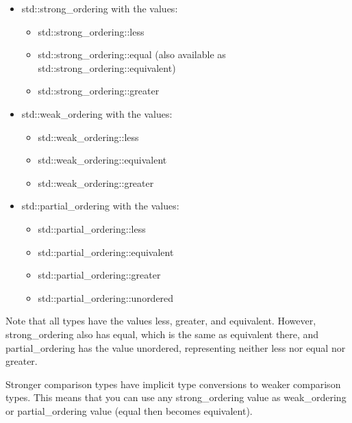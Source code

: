 
\begin{itemize}
\item
std::strong\_ordering with the values:
\begin{itemize}
\item
std::strong\_ordering::less

\item
std::strong\_ordering::equal (also available as std::strong\_ordering::equivalent)

\item
std::strong\_ordering::greater
\end{itemize}

\item
std::weak\_ordering with the values:
\begin{itemize}
\item
std::weak\_ordering::less

\item
std::weak\_ordering::equivalent

\item
std::weak\_ordering::greater
\end{itemize}

\item
std::partial\_ordering with the values:
\begin{itemize}
\item
std::partial\_ordering::less

\item
std::partial\_ordering::equivalent

\item
std::partial\_ordering::greater

\item
std::partial\_ordering::unordered
\end{itemize}
\end{itemize}

Note that all types have the values less, greater, and equivalent. However, strong\_ordering also has equal, which is the same as equivalent there, and partial\_ordering has the value unordered, representing neither less nor equal nor greater.

Stronger comparison types have implicit type conversions to weaker comparison types. This means that you can use any strong\_ordering value as weak\_ordering or partial\_ordering value (equal then becomes equivalent).


